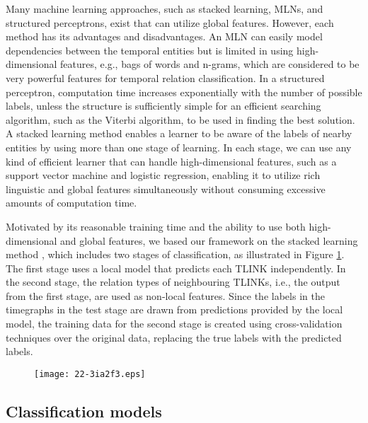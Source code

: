 \documentclass[english]{jnlp_1.4}
\begin{document}
Many machine learning approaches, such as stacked learning, MLNs, and structured perceptrons, exist that can utilize global features.
However, each method has its advantages and disadvantages.
An MLN can easily model dependencies between the temporal entities but is limited in using high-dimensional features, e.g., bags of words and n-grams, which are considered to be very powerful features for temporal relation classification.
In a structured perceptron, computation time increases exponentially with the number of possible labels, unless the structure is sufficiently simple for an efficient searching algorithm, such as the Viterbi algorithm, to be used in finding the best solution.
A stacked learning method enables a learner to be aware of the labels of nearby entities by using more than one stage of learning.
In each stage, we can use any kind of efficient learner that can handle high-dimensional features, such as a support vector machine and logistic regression, enabling it to utilize rich linguistic and global features simultaneously without consuming excessive amounts of computation time.

Motivated by its reasonable training time and the ability to use both high-dimensional and global features, we based our framework on the stacked learning method , which includes two stages of classification, as illustrated in Figure \ref{fig:stack}.
The first stage uses a local model that predicts each TLINK independently.
In the second stage, the relation types of neighbouring TLINKs, i.e., the output from the first stage, are used as non-local features.
Since the labels in the timegraphs in the test stage are drawn from predictions provided by the local model, the training data for the second stage is created using cross-validation techniques over the original data, replacing the true labels with the predicted labels.

\begin{figure}[t]
\begin{center}
\texttt{[image: 22-3ia2f3.eps]}
\end{center}
\label{fig:stack}
\end{figure}


\subsection{Classification models}
\label{subsec:overview}
\end{document}
